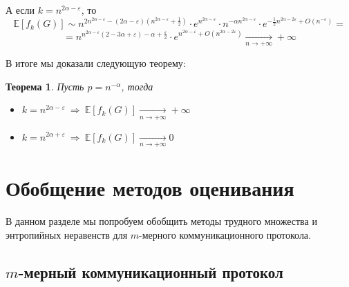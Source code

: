 \documentclass[a4paper]{article}
\newtheorem*{mtheorem}{Теорема}
\begin{document}
	А если $k = n^{2\alpha - \varepsilon}$, то $$\mathbb{E}[f_k(G)] \sim n^{2n^{2\alpha - \varepsilon} - 
	(2\alpha - \varepsilon)(n^{2\alpha - \varepsilon} + \frac{1}{2})}\cdot e^{n^{2\alpha - \varepsilon}}\cdot 
	n^{-\alpha n^{2\alpha-\varepsilon}}\cdot e^{-\frac{1}{2}n^{2\alpha - 2\varepsilon} + O\left(n^{-\varepsilon}\right)} = $$
	$$ = n^{n^{2\alpha - \varepsilon}(2 - 3\alpha +\varepsilon) - \alpha + \frac{\varepsilon}{2}}\cdot 
	e^{n^{2\alpha - \varepsilon}+O(n^{2\alpha - 2\varepsilon})}\xrightarrow[n \to +\infty]{} +\infty$$

	В итоге мы доказали следующую теорему:
	\begin{mtheorem}
	    Пусть $p = n^{-\alpha}$, тогда 
	    \begin{itemize}[noitemsep]
	        \item $k = n^{2\alpha - \varepsilon}\ \Longrightarrow\ \mathbb{E}[f_k(G)]\xrightarrow[n \to +\infty]{} +\infty$
	        \item $k = n^{2\alpha + \varepsilon}\ \Longrightarrow\ \mathbb{E}[f_k(G)]\xrightarrow[n \to +\infty]{} 0$
	    \end{itemize}
	\end{mtheorem}

\addtocounter{section}{1}
\section*{Обобщение методов оценивания}
В данном разделе мы попробуем обобщить методы трудного множества и энтропийных неравенств для $m$-мерного 
коммуникационного протокола. 

\setcounter{subsection}{0}
\subsection{$m$-мерный коммуникационный протокол}



\end{document}
